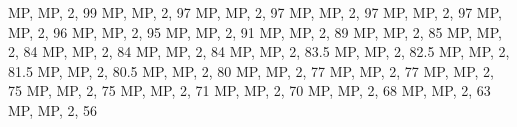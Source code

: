 \documentclass[
]{book}
\newenvironment{Shaded}{\begin{snugshade}}{\end{snugshade}}
\newcommand{\StringTok}[1]{\textcolor[rgb]{0.31,0.60,0.02}{#1}}
\begin{document}
\begin{Shaded}
\begin{Highlighting}[]
\StringTok{ \textquotesingle{}MP\textquotesingle{}, \textquotesingle{}MP\textquotesingle{}, 2, 99}
\StringTok{ \textquotesingle{}MP\textquotesingle{}, \textquotesingle{}MP\textquotesingle{}, 2, 97}
\StringTok{ \textquotesingle{}MP\textquotesingle{}, \textquotesingle{}MP\textquotesingle{}, 2, 97}
\StringTok{ \textquotesingle{}MP\textquotesingle{}, \textquotesingle{}MP\textquotesingle{}, 2, 97}
\StringTok{ \textquotesingle{}MP\textquotesingle{}, \textquotesingle{}MP\textquotesingle{}, 2, 97}
\StringTok{ \textquotesingle{}MP\textquotesingle{}, \textquotesingle{}MP\textquotesingle{}, 2, 96}
\StringTok{ \textquotesingle{}MP\textquotesingle{}, \textquotesingle{}MP\textquotesingle{}, 2, 95}
\StringTok{ \textquotesingle{}MP\textquotesingle{}, \textquotesingle{}MP\textquotesingle{}, 2, 91}
\StringTok{ \textquotesingle{}MP\textquotesingle{}, \textquotesingle{}MP\textquotesingle{}, 2, 89}
\StringTok{ \textquotesingle{}MP\textquotesingle{}, \textquotesingle{}MP\textquotesingle{}, 2, 85}
\StringTok{ \textquotesingle{}MP\textquotesingle{}, \textquotesingle{}MP\textquotesingle{}, 2, 84}
\StringTok{ \textquotesingle{}MP\textquotesingle{}, \textquotesingle{}MP\textquotesingle{}, 2, 84}
\StringTok{ \textquotesingle{}MP\textquotesingle{}, \textquotesingle{}MP\textquotesingle{}, 2, 84}
\StringTok{ \textquotesingle{}MP\textquotesingle{}, \textquotesingle{}MP\textquotesingle{}, 2, 83.5}
\StringTok{ \textquotesingle{}MP\textquotesingle{}, \textquotesingle{}MP\textquotesingle{}, 2, 82.5}
\StringTok{ \textquotesingle{}MP\textquotesingle{}, \textquotesingle{}MP\textquotesingle{}, 2, 81.5}
\StringTok{ \textquotesingle{}MP\textquotesingle{}, \textquotesingle{}MP\textquotesingle{}, 2, 80.5}
\StringTok{ \textquotesingle{}MP\textquotesingle{}, \textquotesingle{}MP\textquotesingle{}, 2, 80}
\StringTok{ \textquotesingle{}MP\textquotesingle{}, \textquotesingle{}MP\textquotesingle{}, 2, 77}
\StringTok{ \textquotesingle{}MP\textquotesingle{}, \textquotesingle{}MP\textquotesingle{}, 2, 77}
\StringTok{ \textquotesingle{}MP\textquotesingle{}, \textquotesingle{}MP\textquotesingle{}, 2, 75}
\StringTok{ \textquotesingle{}MP\textquotesingle{}, \textquotesingle{}MP\textquotesingle{}, 2, 75}
\StringTok{ \textquotesingle{}MP\textquotesingle{}, \textquotesingle{}MP\textquotesingle{}, 2, 71}
\StringTok{ \textquotesingle{}MP\textquotesingle{}, \textquotesingle{}MP\textquotesingle{}, 2, 70}
\StringTok{ \textquotesingle{}MP\textquotesingle{}, \textquotesingle{}MP\textquotesingle{}, 2, 68}
\StringTok{ \textquotesingle{}MP\textquotesingle{}, \textquotesingle{}MP\textquotesingle{}, 2, 63}
\StringTok{ \textquotesingle{}MP\textquotesingle{}, \textquotesingle{}MP\textquotesingle{}, 2, 56}

\end{Highlighting}
\end{Shaded}
\end{document}
